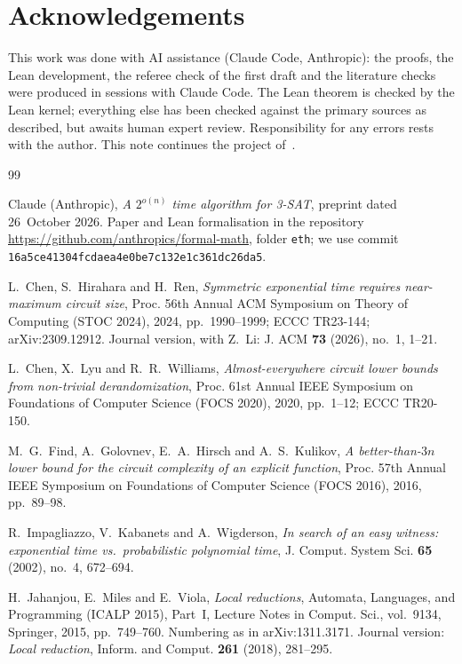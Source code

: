 \documentclass[10pt]{amsart}
\theoremstyle{plain}
\theoremstyle{definition}
\theoremstyle{remark}
\numberwithin{equation}{section}
\begin{document}
\section*{Acknowledgements}
This work was done with AI assistance (Claude Code, Anthropic): the proofs, the Lean
development, the referee check of the first draft and the literature checks were produced in
sessions with Claude Code. The Lean theorem is checked by the Lean kernel; everything else has been
checked against the primary sources as described, but awaits human expert review. Responsibility for
any errors rests with the author. This note continues the project of~\cite{Tulsyan26}.

\begin{thebibliography}{99}

Claude (Anthropic), \emph{A $2^{o(n)}$ time algorithm for {3-SAT}}, preprint dated 26~October 2026.
Paper and Lean formalisation in the repository \url{https://github.com/anthropics/formal-math}, folder
\texttt{eth}; we use commit \texttt{16a5ce41304fcdaea4e0be7c132e1c361dc26da5}.

L.~Chen, S.~Hirahara and H.~Ren, \emph{Symmetric exponential time requires near-maximum circuit
size}, Proc. 56th Annual ACM Symposium on Theory of Computing (STOC 2024), 2024, pp.~1990--1999;
ECCC TR23-144; arXiv:2309.12912. Journal version, with Z.~Li: J. ACM \textbf{73} (2026), no.~1,
1--21.

L.~Chen, X.~Lyu and R.~R.~Williams, \emph{Almost-everywhere circuit lower bounds from non-trivial
derandomization}, Proc. 61st Annual IEEE Symposium on Foundations of Computer Science (FOCS 2020),
2020, pp.~1--12; ECCC TR20-150.

M.~G.~Find, A.~Golovnev, E.~A.~Hirsch and A.~S.~Kulikov, \emph{A better-than-$3n$ lower bound for the
circuit complexity of an explicit function}, Proc. 57th Annual IEEE Symposium on Foundations of
Computer Science (FOCS 2016), 2016, pp.~89--98.

R.~Impagliazzo, V.~Kabanets and A.~Wigderson, \emph{In search of an easy witness: exponential time
vs.\ probabilistic polynomial time}, J. Comput. System Sci. \textbf{65} (2002), no.~4, 672--694.

H.~Jahanjou, E.~Miles and E.~Viola, \emph{Local reductions}, Automata, Languages, and Programming
(ICALP 2015), Part~I, Lecture Notes in Comput. Sci., vol.~9134, Springer, 2015, pp.~749--760.
Numbering as in arXiv:1311.3171. Journal version: \emph{Local reduction}, Inform. and Comput.
\textbf{261} (2018), 281--295.


\end{thebibliography}
\end{document}
